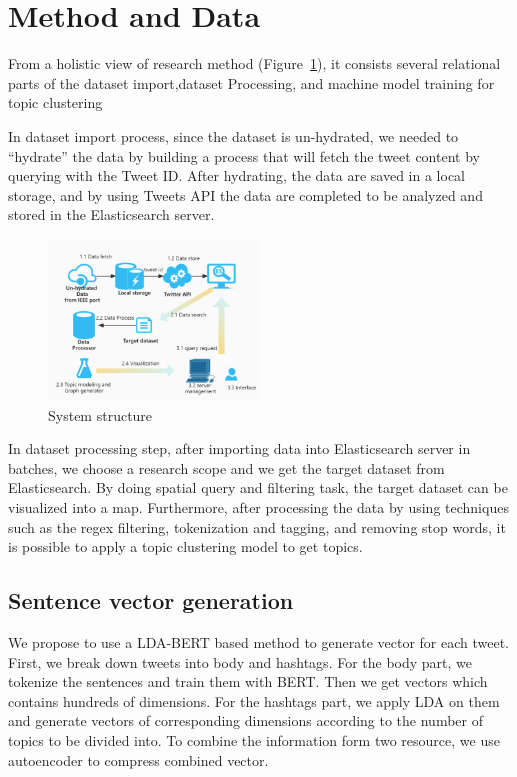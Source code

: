 \section{Method and Data} 
\label{sec:method}
From a holistic view of research method (Figure~\ref{fig:System structure}), it
consists several relational parts of the dataset import,dataset Processing, and machine model training for topic clustering

In dataset import process, since the dataset is un-hydrated, we needed
to “hydrate” the data by building a process that will fetch the tweet content
by querying with the Tweet ID. After hydrating, the data are saved in a local
storage, and by using Tweets API the data are completed to be analyzed and
stored in the Elasticsearch server. 
\begin{figure}[h]
\centering
\includegraphics[width=0.5\textwidth]{imgs/framework/framework.png}
\caption{System structure}
\label{fig:System structure}
\end{figure}
In dataset processing step, after importing data into Elasticsearch server in
batches, we choose a research scope and we get the target dataset from
Elasticsearch. By doing spatial query and filtering task, the target dataset
can be visualized into a map. Furthermore, after processing the data by using
techniques such as the regex filtering, tokenization and tagging, and
removing stop words, it is possible to apply a topic clustering model to get topics.





\subsection{Sentence vector generation}
We propose to use a LDA-BERT based method to generate vector for each tweet. First, we break down tweets into body and hashtags. For the body part, we tokenize the sentences and train them with BERT. Then we get vectors which contains hundreds of dimensions. For the hashtags part, we apply LDA on them and generate vectors of corresponding dimensions according to the number of topics to be divided into. To combine the information form two resource, we use autoencoder to compress combined vector.

